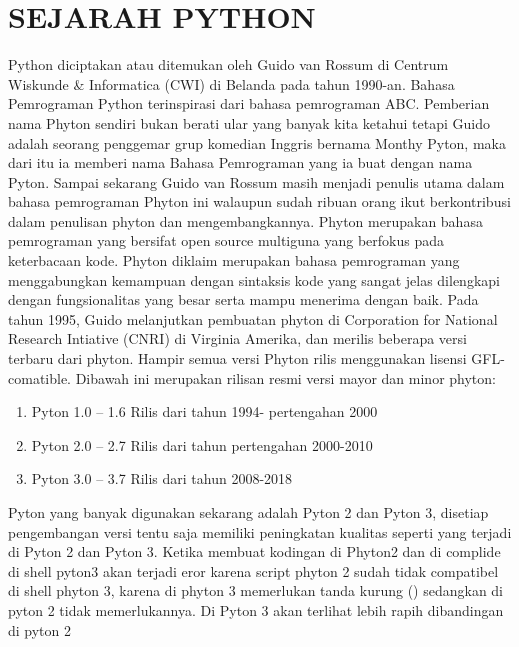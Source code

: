\chapter*{ SEJARAH PYTHON}

\par
	Python diciptakan atau ditemukan oleh Guido van Rossum di Centrum Wiskunde \& Informatica (CWI) di Belanda pada tahun 1990-an. Bahasa Pemrograman Python terinspirasi dari bahasa pemrograman ABC. Pemberian nama Phyton sendiri bukan berati ular yang banyak kita ketahui tetapi Guido adalah seorang penggemar grup komedian Inggris bernama Monthy Pyton, maka dari itu ia memberi nama Bahasa Pemrograman yang ia buat dengan nama Pyton. Sampai sekarang Guido van Rossum masih menjadi penulis utama dalam bahasa pemrograman Phyton ini walaupun sudah ribuan orang ikut berkontribusi dalam penulisan phyton dan mengembangkannya. Phyton merupakan bahasa pemrograman yang bersifat open source multiguna yang berfokus pada keterbacaan kode. Phyton diklaim merupakan bahasa pemrograman yang menggabungkan kemampuan dengan sintaksis kode yang sangat jelas dilengkapi dengan fungsionalitas yang besar serta mampu menerima dengan baik. Pada tahun 1995, Guido melanjutkan pembuatan phyton di Corporation for National Research Intiative (CNRI) di Virginia Amerika, dan merilis beberapa versi terbaru dari phyton. Hampir semua versi Phyton rilis menggunakan lisensi GFL-comatible. Dibawah ini merupakan rilisan resmi versi mayor dan minor phyton:
		
\begin{enumerate}
\item Pyton 1.0 – 1.6 Rilis dari tahun 1994- pertengahan 2000
\item Pyton 2.0 – 2.7 Rilis dari tahun pertengahan 2000-2010 
\item Pyton 3.0 – 3.7 Rilis dari tahun 2008-2018
\end{enumerate}

\par
	Pyton yang banyak digunakan sekarang adalah Pyton 2 dan Pyton 3, disetiap pengembangan versi tentu saja memiliki peningkatan kualitas seperti yang terjadi di Pyton 2 dan Pyton 3. Ketika membuat kodingan di Phyton2 dan di complide di shell pyton3 akan terjadi eror karena script phyton 2 sudah tidak compatibel di shell phyton 3, karena di phyton 3 memerlukan tanda kurung () sedangkan di pyton 2 tidak memerlukannya. Di Pyton 3 akan terlihat lebih rapih dibandingan di pyton 2 
